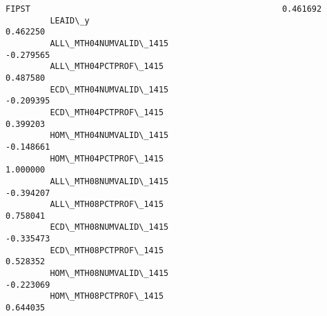 \documentclass[11pt]{article}
\begin{document}
\begin{Verbatim}[commandchars=\\\{\}]
         FIPST                                                   0.461692   
         LEAID\_y                                                 0.462250   
         ALL\_MTH04NUMVALID\_1415                                 -0.279565   
         ALL\_MTH04PCTPROF\_1415                                   0.487580   
         ECD\_MTH04NUMVALID\_1415                                 -0.209395   
         ECD\_MTH04PCTPROF\_1415                                   0.399203   
         HOM\_MTH04NUMVALID\_1415                                 -0.148661   
         HOM\_MTH04PCTPROF\_1415                                   1.000000   
         ALL\_MTH08NUMVALID\_1415                                 -0.394207   
         ALL\_MTH08PCTPROF\_1415                                   0.758041   
         ECD\_MTH08NUMVALID\_1415                                 -0.335473   
         ECD\_MTH08PCTPROF\_1415                                   0.528352   
         HOM\_MTH08NUMVALID\_1415                                 -0.223069   
         HOM\_MTH08PCTPROF\_1415                                   0.644035   
         

\end{Verbatim}
\end{document}

